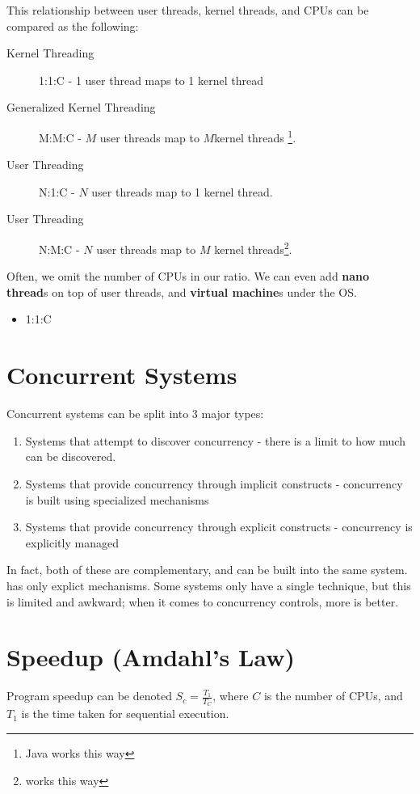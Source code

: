            This relationship between user threads, kernel threads, and CPUs can be compared as the following:
            \begin{description}
                \item[Kernel Threading] 1:1:C - 1 user thread maps to 1 kernel thread
                \item[Generalized Kernel Threading] M:M:C - $M$ user threads map to $M$kernel threads \footnote{Java works this way}.
                \item[User Threading] N:1:C - $N$ user threads map to 1 kernel thread.
                \item[User Threading] N:M:C - $N$ user threads map to $M$ kernel threads\footnote{\uC works this way}.
            \end{description}
            Often, we omit the number of CPUs in our ratio.
            We can even add \textbf{nano thread}s on top of user threads, and \textbf{virtual machine}s under the OS.
            \begin{itemize}
                \item 1:1:C
            \end{itemize}
        \section{Concurrent Systems} %
        \label{sec:concurrent_systems}
            Concurrent systems can be split into 3 major types:
            \begin{enumerate}
                \item Systems that attempt to discover concurrency - there is a limit to how much can be discovered.
                \item Systems that provide concurrency through implicit constructs - concurrency is built using specialized mechanisms
                \item Systems that provide concurrency through explicit constructs - concurrency is explicitly managed
            \end{enumerate}
            In fact, both of these are complementary, and can be built into the same system.
            \uC has only explict mechanisms.
            Some systems only have a single technique, but this is limited and awkward; when it comes to concurrency controls, more is better.
        \section{Speedup (Amdahl's Law)} %
        \label{sec:speedup}
            Program speedup can be denoted $S_c = \frac{T_1}{T_C}$, where $C$ is the number of CPUs, and $T_1$ is the time taken for sequential execution.


